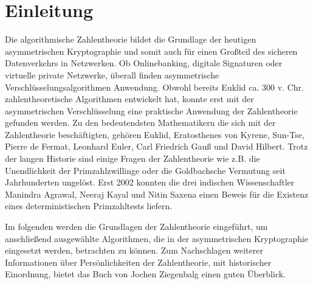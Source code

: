 \section{Einleitung}
	Die algorithmische Zahlentheorie bildet die Grundlage der heutigen asymmetrischen Kryptographie und somit auch für einen Großteil des sicheren Datenverkehrs in Netzwerken. Ob Onlinebanking, digitale Signaturen oder virtuelle private Netzwerke, überall finden asymmetrische Verschlüsselungsalgorithmen Anwendung. Obwohl bereits Euklid ca. 300 v. Chr. zahlentheoretische Algorithmen entwickelt hat, konnte erst mit der asymmetrischen Verschlüsselung eine praktische Anwendung der Zahlentheorie gefunden werden. Zu den bedeutendsten Mathematikern die sich mit der Zahlentheorie beschäftigten, gehören Euklid, Eratosthenes von Kyrene, Sun-Tse, Pierre de Fermat, Leonhard Euler, Carl Friedrich Gauß und David Hilbert. Trotz der langen Historie sind einige Fragen der Zahlentheorie wie z.B. die Unendlichkeit der Primzahlzwillinge oder die Goldbachsche Vermutung seit Jahrhunderten ungelöst. Erst 2002 konnten die drei indischen Wissenschaftler Manindra Agrawal, Neeraj Kayal und Nitin Saxena einen Beweis für die Existenz eines deterministischen Primzahltests liefern.\cite{Primes:is:in:P}
	
	Im folgenden werden die Grundlagen der Zahlentheorie eingeführt, um anschließend ausgewählte Algorithmen, die in der asymmetrischen Kryptographie eingesetzt werden, betrachten zu können. Zum Nachschlagen weiterer Informationen über Persönlichkeiten der Zahlentheorie, mit historischer Einordnung, bietet das Buch \cite{Elementare:Zahlentheorie} von Jochen Ziegenbalg einen guten Überblick.